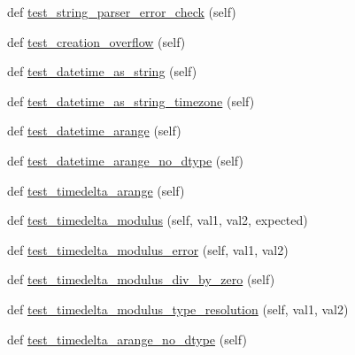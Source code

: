 \begin{DoxyCompactItemize}
\item 
def \hyperlink{classnumpy_1_1core_1_1tests_1_1test__datetime_1_1TestDateTime_a2538b9473d56d184ad64cba38e079301}{test\+\_\+string\+\_\+parser\+\_\+error\+\_\+check} (self)
\item 
def \hyperlink{classnumpy_1_1core_1_1tests_1_1test__datetime_1_1TestDateTime_ab5c4538366651b62a6bbd82dd031c81e}{test\+\_\+creation\+\_\+overflow} (self)
\item 
def \hyperlink{classnumpy_1_1core_1_1tests_1_1test__datetime_1_1TestDateTime_a6556fb264c303414afd6e7d6bcb734fc}{test\+\_\+datetime\+\_\+as\+\_\+string} (self)
\item 
def \hyperlink{classnumpy_1_1core_1_1tests_1_1test__datetime_1_1TestDateTime_a62244771cee4a06c0e7b9f1e9ea7dc0d}{test\+\_\+datetime\+\_\+as\+\_\+string\+\_\+timezone} (self)
\item 
def \hyperlink{classnumpy_1_1core_1_1tests_1_1test__datetime_1_1TestDateTime_a0d1821213690482fc8a0721c647dcdde}{test\+\_\+datetime\+\_\+arange} (self)
\item 
def \hyperlink{classnumpy_1_1core_1_1tests_1_1test__datetime_1_1TestDateTime_acf3ccb907f2e82109fce73375a74493a}{test\+\_\+datetime\+\_\+arange\+\_\+no\+\_\+dtype} (self)
\item 
def \hyperlink{classnumpy_1_1core_1_1tests_1_1test__datetime_1_1TestDateTime_a5b037c049251fb4d3879b20b6980194f}{test\+\_\+timedelta\+\_\+arange} (self)
\item 
def \hyperlink{classnumpy_1_1core_1_1tests_1_1test__datetime_1_1TestDateTime_a83e69ded25165bfe3b7b2fb8f7dba039}{test\+\_\+timedelta\+\_\+modulus} (self, val1, val2, expected)
\item 
def \hyperlink{classnumpy_1_1core_1_1tests_1_1test__datetime_1_1TestDateTime_a1c07df202b09f51694fe25e520a00e77}{test\+\_\+timedelta\+\_\+modulus\+\_\+error} (self, val1, val2)
\item 
def \hyperlink{classnumpy_1_1core_1_1tests_1_1test__datetime_1_1TestDateTime_a367583d6c38f16e1642ffc70b6bdd93e}{test\+\_\+timedelta\+\_\+modulus\+\_\+div\+\_\+by\+\_\+zero} (self)
\item 
def \hyperlink{classnumpy_1_1core_1_1tests_1_1test__datetime_1_1TestDateTime_add3c9388500e71423e7c6c26351d465b}{test\+\_\+timedelta\+\_\+modulus\+\_\+type\+\_\+resolution} (self, val1, val2)
\item 
def \hyperlink{classnumpy_1_1core_1_1tests_1_1test__datetime_1_1TestDateTime_aaf5e5a75d1aa133a99f98918269c18ae}{test\+\_\+timedelta\+\_\+arange\+\_\+no\+\_\+dtype} (self)
\item 

\end{DoxyCompactItemize}
